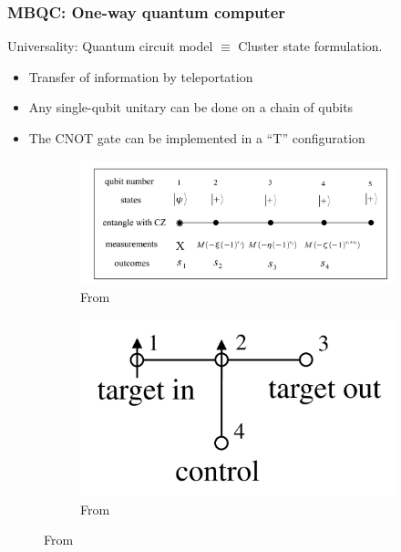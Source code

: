 \documentclass{beamer}
\theoremstyle{definition}
\begin{document}
\begin{frame}
\frametitle{MBQC: One-way quantum computer}

Universality: Quantum circuit model $\equiv$ Cluster state formulation. %

\begin{itemize}
	\item Transfer of information by teleportation
	\item Any single-qubit unitary can be done on a chain of qubits
	\item The CNOT gate can be implemented in a ``T'' configuration
\end{itemize}
\begin{figure}[!htb]
	\begin{subfigure}{.5\textwidth}
		\centering
		\includegraphics[scale=0.15]{rotate}
		\caption{From \cite{jozsa}}
	\end{subfigure}%
	\begin{subfigure}{.5\textwidth}
		\centering
		\includegraphics[scale=0.15]{CNOT}
		\caption{From \cite{MBQC}}
	\end{subfigure}
	
	
\end{figure}






\end{frame}
\end{document}
